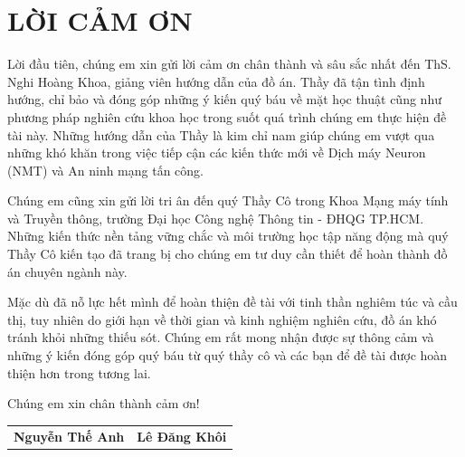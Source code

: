 \chapter*{LỜI CẢM ƠN}

Lời đầu tiên, chúng em xin gửi lời cảm ơn chân thành và sâu sắc nhất đến ThS. Nghi Hoàng Khoa, giảng viên hướng dẫn của đồ án. Thầy đã tận tình định hướng, chỉ bảo và đóng góp những ý kiến quý báu về mặt học thuật cũng như phương pháp nghiên cứu khoa học trong suốt quá trình chúng em thực hiện đề tài này. Những hướng dẫn của Thầy là kim chỉ nam giúp chúng em vượt qua những khó khăn trong việc tiếp cận các kiến thức mới về Dịch máy Neuron (NMT) và An ninh mạng tấn công.

Chúng em cũng xin gửi lời tri ân đến quý Thầy Cô trong Khoa Mạng máy tính và Truyền thông, trường Đại học Công nghệ Thông tin - ĐHQG TP.HCM. Những kiến thức nền tảng vững chắc và môi trường học tập năng động mà quý Thầy Cô kiến tạo đã trang bị cho chúng em tư duy cần thiết để hoàn thành đồ án chuyên ngành này.

Mặc dù đã nỗ lực hết mình để hoàn thiện đề tài với tinh thần nghiêm túc và cầu thị, tuy nhiên do giới hạn về thời gian và kinh nghiệm nghiên cứu, đồ án khó tránh khỏi những thiếu sót. Chúng em rất mong nhận được sự thông cảm và những ý kiến đóng góp quý báu từ quý thầy cô và các bạn để đề tài được hoàn thiện hơn trong tương lai.

Chúng em xin chân thành cảm ơn!

\vspace*{40pt}
\begin{center}
    \begingroup
    \setlength{\tabcolsep}{50pt}
    \begin{tabular}{cc}
        \textbf{Nguyễn Thế Anh} & \textbf{Lê Đăng Khôi}
    \end{tabular}
    \endgroup
\end{center}